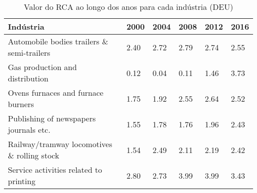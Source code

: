 \begin{table}
\centering
\caption{Valor do RCA ao longo dos anos para cada indústria (DEU)}
\begin{tabular}{p{6cm}p{1.5cm}p{1.5cm}p{1.5cm}p{1.5cm}p{1.5cm}}
\toprule
                                  Indústria & 2000 & 2004 & 2008 & 2012 & 2016 \\
\midrule
 Automobile bodies trailers \& semi-trailers & 2.40 & 2.72 & 2.79 & 2.74 & 2.55 \\
            Gas production and distribution & 0.12 & 0.04 & 0.11 & 1.46 & 3.73 \\
         Ovens furnaces and furnace burners & 1.75 & 1.92 & 2.55 & 2.64 & 2.52 \\
     Publishing of newspapers journals etc. & 1.55 & 1.78 & 1.76 & 1.96 & 2.43 \\
Railway/tramway locomotives \& rolling stock & 1.54 & 2.49 & 2.11 & 2.19 & 2.42 \\
     Service activities related to printing & 2.80 & 2.73 & 3.99 & 3.99 & 3.43 \\
\bottomrule
\end{tabular}
\end{table}
